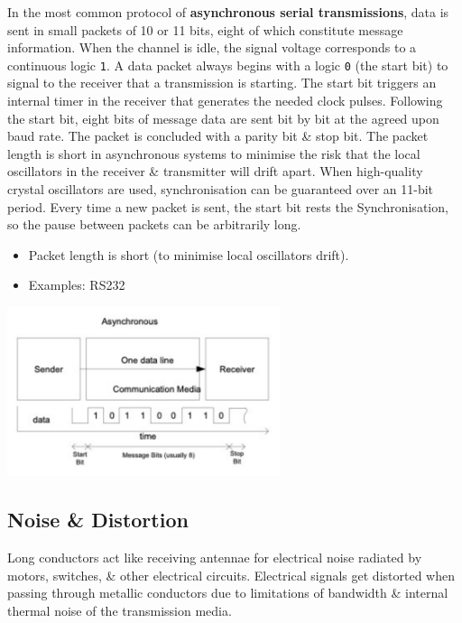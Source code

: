 \documentclass[11pt]{article}
\begin{document}
In the most common protocol of \textbf{asynchronous serial transmissions}, data is sent in small packets of 10 or 11 bits, 
eight of which constitute message information. 
When the channel is idle, the signal voltage corresponds to a continuous logic \verb|1|. 
A data packet always begins with a logic \verb|0| (the start bit) to signal to the receiver that a transmission is starting. 
The start bit triggers an internal timer in the receiver that generates the needed clock pulses. 
Following the start bit, eight bits of message data are sent bit by bit at the agreed upon baud rate. 
The packet is concluded with a parity bit \& stop bit. 
The packet length is short in asynchronous systems to minimise the risk that the local oscillators in the receiver \& transmitter will drift apart. 
When high-quality crystal oscillators are used, synchronisation can be guaranteed over an 11-bit period. 
Every time a new packet is sent, the start bit rests the Synchronisation, so the pause between packets can be arbitrarily long. 
\begin{itemize} 
    \item   Packet length is short (to minimise local oscillators drift). 
    \item   Examples: RS232 
\end{itemize}

\begin{center}
    \includegraphics[width=0.6\textwidth]{serialasynch.png}
\end{center}

\subsection{Noise \& Distortion}
Long conductors act like receiving antennae for electrical noise radiated by motors, switches, \& other electrical circuits. 
Electrical signals get distorted when passing through metallic conductors due to limitations of bandwidth \& internal thermal noise of the transmission media. 
\end{document}

